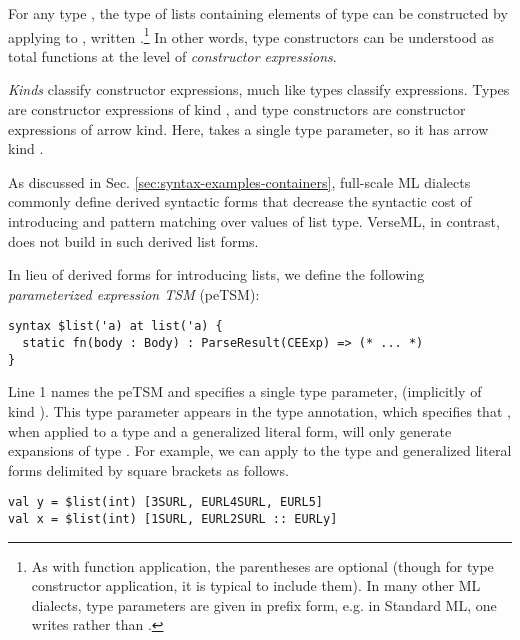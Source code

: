 For any type , the type of lists containing elements of type  can be constructed by applying  to , written .\footnote{As with function application, the parentheses are optional (though for type constructor application, it is typical to include them). In many other ML dialects, type parameters are given in prefix form, e.g. in Standard ML, one writes  rather than .} In other words, type constructors can be understood as total functions at the level of \emph{constructor expressions}. 

\emph{Kinds} classify constructor expressions, much like types classify expressions. Types are constructor expressions of kind , and type constructors are constructor expressions of arrow kind. Here,  takes a single type parameter, so it has arrow kind .

As discussed in Sec. \ref{sec:syntax-examples-containers}, full-scale ML dialects commonly define derived syntactic forms that decrease the syntactic cost of introducing and pattern matching over values of list type. VerseML, in contrast, does not build in such derived list forms. 

In lieu of derived forms for introducing lists, we define the following \emph{parameterized expression TSM} (peTSM):
\begin{lstlisting}
syntax $list('a) at list('a) {
  static fn(body : Body) : ParseResult(CEExp) => (* ... *)
}
\end{lstlisting}
Line 1 names the peTSM  and specifies a single type parameter,  (implicitly of kind ). This type parameter appears in the type annotation, which specifies that , when applied to a type  and a generalized literal form, will only generate expansions of type . For example, we can apply  to the type  and generalized literal forms delimited by square brackets as follows.
\begin{lstlisting}[numbers=none]
val y = $list(int) [3SURL, EURL4SURL, EURL5]
val x = $list(int) [1SURL, EURL2SURL :: EURLy]
\end{lstlisting}

